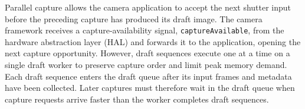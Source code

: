 \label{sec:parallel-capture}
Parallel capture allows the camera application to accept the next shutter input before the preceding capture has produced its draft image.
The camera framework receives a capture-availability signal, \texttt{captureAvailable}, from the hardware abstraction layer (HAL) and forwards it to the application, opening the next capture opportunity.
However, draft sequences execute one at a time on a single draft worker to preserve capture order and limit peak memory demand.
Each draft sequence enters the draft queue after its input frames and metadata have been collected.
Later captures must therefore wait in the draft queue when capture requests arrive faster than the worker completes draft sequences.
